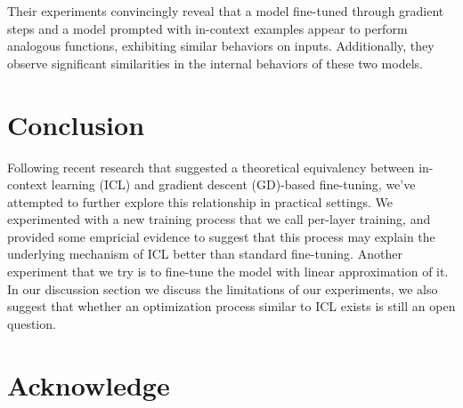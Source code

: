 \documentclass[11pt]{article}
\begin{document}
Their experiments convincingly reveal that a model fine-tuned through gradient steps and a model prompted with in-context examples appear to perform analogous functions, exhibiting similar behaviors on inputs.
Additionally, they observe significant similarities in the internal behaviors of these two models.




\section{Conclusion}
Following recent research that suggested a theoretical equivalency between in-context learning (ICL) and gradient descent (GD)-based fine-tuning, we've attempted to further explore this relationship in practical settings.
We experimented with a new training process that we call per-layer training, 
and provided some empricial evidence to suggest that this process may explain the underlying mechanism of ICL better than standard fine-tuning.
Another experiment that we try is to fine-tune the model with linear approximation of it.
In our discussion section we discuss the limitations of our experiments, we also suggest that whether an optimization process similar to ICL exists is still an open question. 
\section{Acknowledge}

\nocite{rw1}
\nocite{rw2}




\newpage
\appendix
\end{document}
